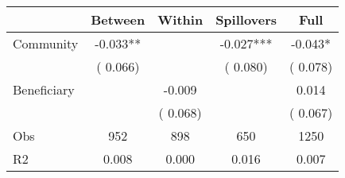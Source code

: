 
\begin{tabular}{l*{4}{c}}\hline&\multicolumn{1}{c}{Between}&\multicolumn{1}{c}{Within}&\multicolumn{1}{c}{Spillovers}&\multicolumn{1}{c}{Full}\\ \hline
 Community             &             -0.033**      &                                               &       -0.027*** &        -0.043*                            \\ 
                               &        (       0.066)           &                                       &       (       0.080)     &      (       0.078)                                           \\ 
 Beneficiary   &                                               &       -0.009    &                                &             0.014                            \\ 
                               &                                               & (       0.068)                  &                                        &      (       0.067)                                           \\ 
\hline                                                                                                                                                                                                                                            
 Obs                   &               952               &       898                       &       650                &              1250                                               \\ 
 R2                    &                      0.008              &              0.000                      &              0.016               &                     0.007                                              \\ 
\hline \end{tabular}                                                                                                                                                                                                              